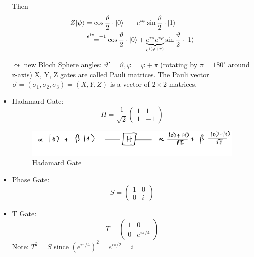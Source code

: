 \begin{itemize}
    Then
    \begin{align*}
        Z \lvert\psi\rangle &= \cos{\frac{\vartheta}{2}} \cdot \lvert0\rangle {\color{red}\text{ }-\text{ }}
            e^{i\varphi} \sin{\frac{\vartheta}{2}} \cdot \lvert1\rangle \\
        &\stackrel{e^{i\pi} = -1}{=} \cos{\frac{\vartheta}{2}} \cdot \lvert0\rangle + 
            \underbrace{e^{i\pi} e^{i\varphi}}_{e^{i(\varphi + \pi)}} \sin{\frac{\vartheta}{2}} \cdot \lvert1\rangle
    \end{align*}

    $\leadsto$ new Bloch Sphere angles: $\vartheta' = \vartheta, \varphi = \varphi + \pi$ 
    (rotating by $\pi = 180^\circ$ around z-axis) \newline
    X, Y, Z gates are called \underline{Pauli matrices}.
    The \underline{Pauli vector} $\vec{\sigma} = (\sigma_1, \sigma_2, \sigma_3) = (X, Y, Z)$
    is a vector of $2 \times 2$ matrices.

    \item Hadamard Gate:
    \begin{equation*}
        H = \frac{1}{\sqrt{2}}  \begin{pmatrix}
            1 & 1 \\
            1 & -1
        \end{pmatrix}
    \end{equation*}

    \begin{figure}[h]
        \centering
        \includegraphics[scale=0.5]{chapters/res/hadamard-gate-circuit.png}
        \caption{Hadamard Gate}
    \end{figure}

    \item Phase Gate:
    \begin{equation*}
        S = \begin{pmatrix}
            1 & 0 \\
            0 & i
        \end{pmatrix}
    \end{equation*}

    \item T Gate:
    \begin{equation*}
        T = \begin{pmatrix}
            1 & 0 \\
            0 & e^{i\pi/4}
        \end{pmatrix}
    \end{equation*}
    Note: $T^2 = S$ since $(e^{i \pi /4})^2 = e^{i\pi/2} = i$
\end{itemize}


